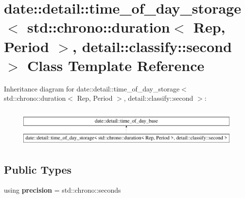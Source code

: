 \hypertarget{classdate_1_1detail_1_1time__of__day__storage_3_01std_1_1chrono_1_1duration_3_01_rep_00_01_perioa4aafe6bf337ed7dabca38dd6be843a3}{}\section{date\+::detail\+::time\+\_\+of\+\_\+day\+\_\+storage$<$ std\+::chrono\+::duration$<$ Rep, Period $>$, detail\+::classify\+::second $>$ Class Template Reference}
\label{classdate_1_1detail_1_1time__of__day__storage_3_01std_1_1chrono_1_1duration_3_01_rep_00_01_perioa4aafe6bf337ed7dabca38dd6be843a3}
Inheritance diagram for date\+::detail\+::time\+\_\+of\+\_\+day\+\_\+storage$<$ std\+::chrono\+::duration$<$ Rep, Period $>$, detail\+::classify\+::second $>$\+:\begin{figure}[H]
\begin{center}
\leavevmode
\includegraphics[height=1.971831cm]{classdate_1_1detail_1_1time__of__day__storage_3_01std_1_1chrono_1_1duration_3_01_rep_00_01_perioa4aafe6bf337ed7dabca38dd6be843a3}
\end{center}
\end{figure}
\subsection*{Public Types}
\begin{DoxyCompactItemize}
\item 
\mbox{\label{classdate_1_1detail_1_1time__of__day__storage_3_01std_1_1chrono_1_1duration_3_01_rep_00_01_perioa4aafe6bf337ed7dabca38dd6be843a3_ab1371d4931ab5caaf0bd72052a8706f0}} 
using {\bfseries precision} = std\+::chrono\+::seconds
\end{DoxyCompactItemize}
